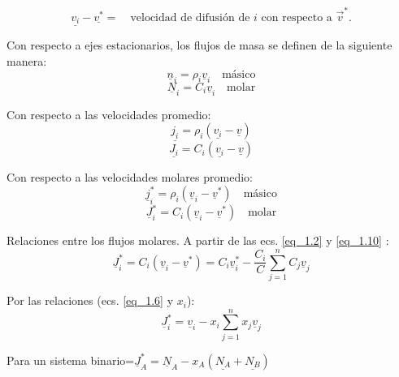  \begin{equation}
 	\underline{{v}_i} -\underline{{v}^*}=\quad \text{velocidad de difusión de $i$ con respecto a $\vec{v}^*$}. \tag{1.4} \label{eq_1.4}
 \end{equation}
 
 Con respecto a ejes estacionarios, los flujos de masa se definen de la siguiente manera:
 \begin{equation}
 	\underline{n}_i = \rho_i \underline{v}_i \quad \text{másico} \tag{1.5}
    \label{eq_1.5}
 \end{equation}
 \begin{equation}
 	\underline{N}_i = C_i \underline{v}_i \quad \text{molar} \tag{1.6}\label{eq_1.6}
 \end{equation}
 
 Con respecto a las velocidades promedio:
 \begin{equation}
 		\underline{{j}_i} = \rho_i (	\underline{{v}_i} -\underline{v}) \tag{1.7}\label{eq_1.7}
 \end{equation}
 \begin{equation}
 	\underline{{J}_i} = C_i (\underline{{v}_i} -	\underline{v}) \tag{1.8} \label{eq_1.8}
 \end{equation}
 
 Con respecto a las velocidades molares promedio:
 \begin{equation}
 	\underline{j}_i^* = \rho_i (\underline{v}_i - \underline{v}^*) \quad \text{másico} \tag{1.9} \label{eq_1.9}
 \end{equation}
 \begin{equation}
 	\underline{J}_i^* = C_i (\underline{v}_i - \underline{v}^*) \quad \text{molar} \tag{1.10} \label{eq_1.10}
 \end{equation}
 
 Relaciones entre los flujos molares. A partir de las ecs. \ref{eq_1.2} y \ref{eq_1.10} :
 \begin{equation}
 	\underline{J}_i^* = C_i (\underline{v}_i - \underline{v}^*) = C_i \underline{v}_i^* - \frac{C_i}{C} \sum_{j=1}^n C_j \underline{v}_j \tag{1.11} \label{eq_1.11}
 \end{equation}
 
 Por las relaciones (ecs. \ref{eq_1.6} y $x_i$):
 \begin{equation}
 	\underline{J}_i^* = \underline{v}_i - x_i \sum_{j=1}^n x_j \underline{v}_j \tag{1.12}\label{eq_1.12}
 \end{equation}
 
 Para un sistema binario=$\underline{J}_A^*=\underline{N}_A-x_A (\underline{N_A}+\underline{N_B})$
 
